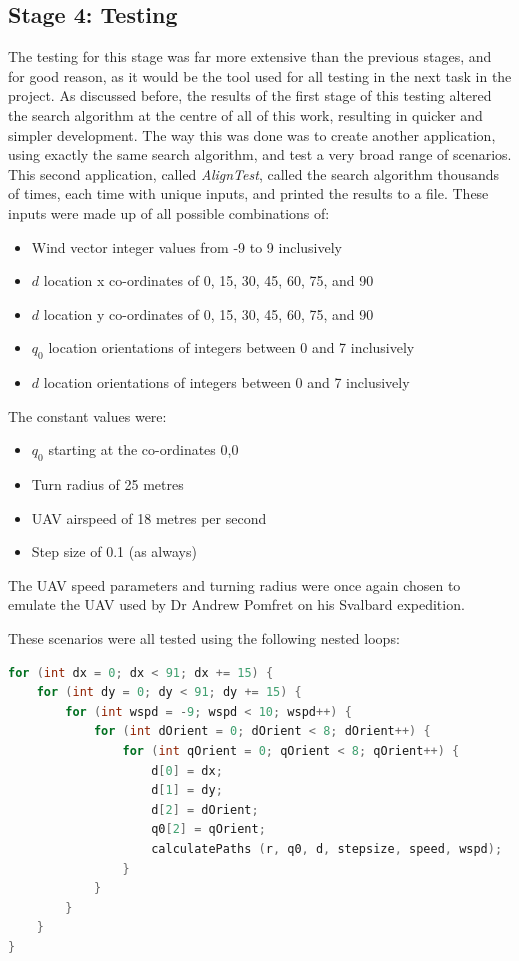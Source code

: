 \subsection{Stage 4: Testing}
\label{task1:stage4:testing}

The testing for this stage was far more extensive than the previous stages, and for good reason, as it would be the tool used for all testing in the next task in the project. As discussed before, the results of the first stage of this testing altered the search algorithm at the centre of all of this work, resulting in quicker and simpler development. The way this was done was to create another application, using exactly the same search algorithm, and test a very broad range of scenarios. This second application, called \textit{AlignTest}, called the search algorithm thousands of times, each time with unique inputs, and printed the results to a file. These inputs were made up of all possible combinations of:

\begin{itemize}
	\item Wind vector integer values from -9 to 9 inclusively
	\item $d$ location x co-ordinates of 0, 15, 30, 45, 60, 75, and 90
	\item $d$ location y co-ordinates of 0, 15, 30, 45, 60, 75, and 90
	\item $q_0$ location orientations of integers between 0 and 7 inclusively
	\item $d$ location orientations of integers between 0 and 7 inclusively
\end{itemize}

The constant values were:
\begin{itemize}
 	\item $q_0$ starting at the co-ordinates 0,0
 	\item Turn radius of 25 metres
 	\item UAV airspeed of 18 metres per second
 	\item Step size of 0.1 (as always)
 \end{itemize} 

 The UAV speed parameters and turning radius were once again chosen to emulate the UAV used by Dr Andrew Pomfret on his Svalbard expedition.

These scenarios were all tested using the following nested loops:

\begin{minipage}{\linewidth}
\begin{lstlisting}[language=C++]
for (int dx = 0; dx < 91; dx += 15) {
    for (int dy = 0; dy < 91; dy += 15) {
        for (int wspd = -9; wspd < 10; wspd++) {
            for (int dOrient = 0; dOrient < 8; dOrient++) {
                for (int qOrient = 0; qOrient < 8; qOrient++) {
                    d[0] = dx;
                    d[1] = dy;
                    d[2] = dOrient;
                    q0[2] = qOrient;
                    calculatePaths (r, q0, d, stepsize, speed, wspd);
                }
            }
        }
    }
}
\end{lstlisting}
\end{minipage}

